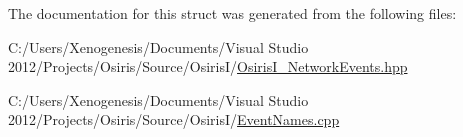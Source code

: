 The documentation for this struct was generated from the following files\-:\begin{DoxyCompactItemize}
\item 
C\-:/\-Users/\-Xenogenesis/\-Documents/\-Visual Studio 2012/\-Projects/\-Osiris/\-Source/\-Osiris\-I/\hyperlink{_osiris_i___network_events_8hpp}{Osiris\-I\-\_\-\-Network\-Events.\-hpp}\item 
C\-:/\-Users/\-Xenogenesis/\-Documents/\-Visual Studio 2012/\-Projects/\-Osiris/\-Source/\-Osiris\-I/\hyperlink{_event_names_8cpp}{Event\-Names.\-cpp}\end{DoxyCompactItemize}
